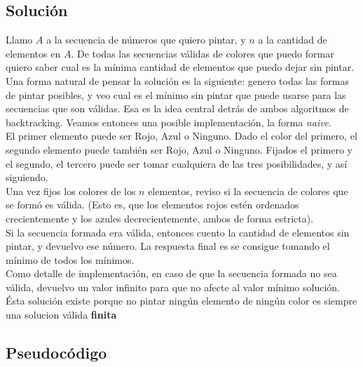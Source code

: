 \subsection{Solución}

Llamo $A$ a la secuencia de números que quiero pintar, y $n$ a la cantidad de elementos en $A$. De todas las secuencias válidas de colores que puedo formar quiero saber cual es la mínima cantidad de elementos que puedo dejar sin pintar. \\

Una forma natural de pensar la solución es la siguiente: genero todas las formas de pintar posibles, y veo cual es el mínimo sin pintar que puede usarse para las secuencias que son válidas. Esa es la idea central detrás de ambos algoritmos de backtracking. Veamos entonces una posible implementación, la forma \textit{naive}. \\

El primer elemento puede ser Rojo, Azul o Ninguno. Dado el color del primero, el segundo elemento puede también ser Rojo, Azul o Ninguno. Fijados el primero y el segundo, el tercero puede ser tomar cualquiera de las tres posibilidades, y así siguiendo. \\

Una vez fijos los colores de los $n$ elementos, reviso si la secuencia de colores que se formó es válida. (Esto es, que los elementos rojos estén ordenados crecientemente y los azules decrecientemente, ambos de forma estricta). \\

Si la secuencia formada era válida, entonces cuento la cantidad de elementos sin pintar, y devuelvo ese número. La respuesta final es se consigue tomando el mínimo de todos los mínimos. \\

Como detalle de implementación, en caso de que la secuencia formada no sea válida, devuelvo un valor infinito para que no afecte al valor mínimo solución. Ésta solución existe porque no pintar ningún elemento de ningún color es siempre una solucion válida \textbf{finita}


\subsection{Pseudocódigo}

